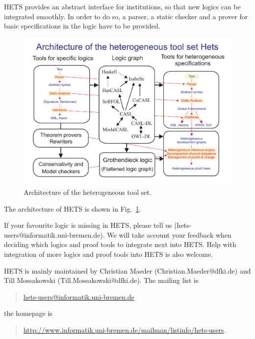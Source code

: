 \documentclass{article}
\newcommand{\normalTEXTSC}[2]{{#1\scriptsize#2}}
\newcommand     {\Hets}{\normalTEXTSC{H}{ETS}\xspace}
\begin{document}
\Hets provides an abstract interface for 
institutions, so
that new logics can be integrated smoothly. 
In order to do so, a parser,
a static checker and a prover for basic specifications in the logic have
to be provided.



\begin{figure}
\begin{center}
\includegraphics[scale=0.4]{hets2007}
\end{center}
%
\caption{Architecture of the heterogeneous tool set.
\label{fig:hets}}
\end{figure}

The architecture of \Hets is shown in Fig.~\ref{fig:hets}. 

If your favourite logic is missing in \Hets, please tell us
(hets-users@informatik.uni-bremen.de). We will take account your feedback when deciding which
logics and proof tools to integrate next into \Hets. Help with
integration of more logics and proof tools into \Hets is also welcome.

\Hets is mainly maintained by
Christian Maeder (Christian.Maeder@dfki.de) and Till Mossakowski
(Till.Mossakowski@dfki.de). The mailing list is
\begin{quote}
 \url{hets-users@informatik.uni-bremen.de}
\end{quote}
the homepage is
\begin{quote}
\url{http://www.informatik.uni-bremen.de/mailman/listinfo/hets-users}.
\end{quote}
\end{document}

